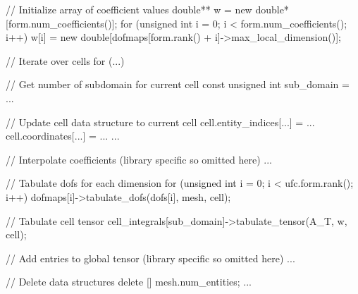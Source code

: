 \begin{c++}
{  // Initialize array of coefficient values
  double** w = new double*[form.num_coefficients()];
  for (unsigned int i = 0; i < form.num_coefficients(); i++)
    w[i] = new double[dofmaps[form.rank() + i]->max_local_dimension()];

  // Iterate over cells
  for (...)
  {
    // Get number of subdomain for current cell
    const unsigned int sub_domain = ...

    // Update cell data structure to current cell
    cell.entity_indices[...] = ...
    cell.coordinates[...] = ...
    ...

    // Interpolate coefficients (library specific so omitted here)
    ...

    // Tabulate dofs for each dimension
    for (unsigned int i = 0; i < ufc.form.rank(); i++)
      dofmaps[i]->tabulate_dofs(dofs[i], mesh, cell);

    // Tabulate cell tensor
    cell_integrals[sub_domain]->tabulate_tensor(A_T, w, cell);

    // Add entries to global tensor (library specific so omitted here)
    ...
  }

  // Delete data structures
  delete [] mesh.num_entities;
  ...
}
\end{c++}
